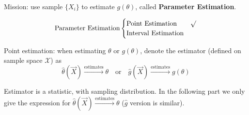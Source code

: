     Mission: use sample $\{X_i\}$ to estimate $g(\theta)$, called \textbf{Parameter Estimation}.

    \begin{equation}
        \text{Parameter Estimation}\begin{cases}
            \text{Point Estimation}& \surd\\
            \text{Interval Estimation}&
        \end{cases}    
    \end{equation}

    Point estimation: when estimating $\theta$ or $g(\theta)$, denote the estimator (defined on sample space $\mathscr{X}$) as
    \begin{equation}
        \hat{\theta}(\vec{X})\xrightarrow[]{\text{estimates}} \theta \quad \text{or}\quad \hat{g}(\vec{X})    \xrightarrow[]{\text{estimates}} g(\theta )
    \end{equation}

    Estimator is a statistic, with sampling distribution. In the following part we only give the expression for $ \hat{\theta }(\vec{X})\xrightarrow[]{\text{estimates}} \theta  $ ($ \hat{g} $ version is similar).
